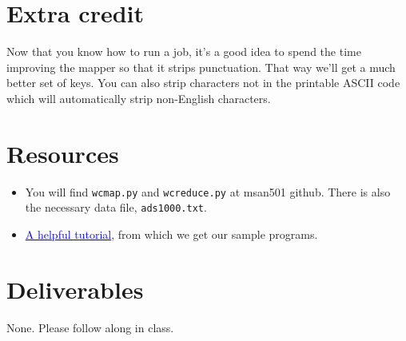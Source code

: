 \begin{fullwidth}
\section{Extra credit}

Now that you know how to run a job, it's a good idea to spend the time improving the mapper so that it strips punctuation. That way we'll get a much better set of keys. You can also strip characters not in the printable ASCII code which will automatically strip non-English characters.

\section{Resources}

\begin{itemize}
\item You will find {\tt wcmap.py} and {\tt wcreduce.py} at msan501 github. There is also the necessary data file, {\tt ads1000.txt}.
\item \href{http://cs.smith.edu/dftwiki/index.php/Hadoop_Tutorial_3.2_--_Using_Your_Own_Streaming_WordCount_program}{\textcolor{blue}{A helpful tutorial}}, from which we get our sample programs.
\end{itemize}

\section{Deliverables}

None. Please follow along in class.

\end{fullwidth}
